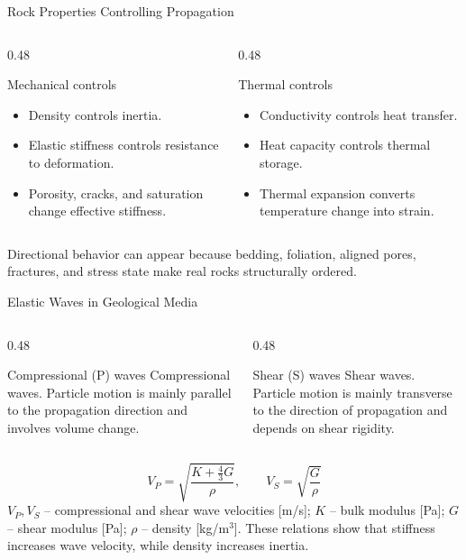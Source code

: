 \documentclass[aspectratio=169,10pt]{beamer}
\begin{document}
\begin{frame}{Rock Properties Controlling Propagation}
  \begin{columns}[T]
    \begin{column}{0.48\textwidth}
      \begin{block}{Mechanical controls}
        \begin{itemize}
          \item Density controls inertia.
          \item Elastic stiffness controls resistance to deformation.
          \item Porosity, cracks, and saturation change effective stiffness.
        \end{itemize}
      \end{block}
    \end{column}
    \begin{column}{0.48\textwidth}
      \begin{block}{Thermal controls}
        \begin{itemize}
          \item Conductivity controls heat transfer.
          \item Heat capacity controls thermal storage.
          \item Thermal expansion converts temperature change into strain.
        \end{itemize}
      \end{block}
    \end{column}
  \end{columns}
  \vskip 6pt
  Directional behavior can appear because bedding, foliation, aligned
  pores, fractures, and stress state make real rocks structurally ordered.
\end{frame}

\begin{frame}{Elastic Waves in Geological Media}
  \begin{columns}[T]
    \begin{column}{0.48\textwidth}
      \begin{block}{Compressional (P) waves}
        Compressional waves. Particle motion is mainly parallel to the
        propagation direction and involves volume change.
      \end{block}
    \end{column}
    \begin{column}{0.48\textwidth}
      \begin{block}{Shear (S) waves}
        Shear waves. Particle motion is mainly transverse to the direction
        of propagation and depends on shear rigidity.
      \end{block}
    \end{column}
  \end{columns}
  \vskip 6pt
  \[
    V_P = \sqrt{\frac{K+\frac{4}{3}G}{\rho}},
    \qquad
    V_S = \sqrt{\frac{G}{\rho}}
  \]
  \scriptsize
  $V_P,V_S$ -- compressional and shear wave velocities [m/s];
  $K$ -- bulk modulus [Pa]; $G$ -- shear modulus [Pa];
  $\rho$ -- density [kg/m$^3$]. These relations show that stiffness
  increases wave velocity, while density increases inertia.
\end{frame}
\end{document}
